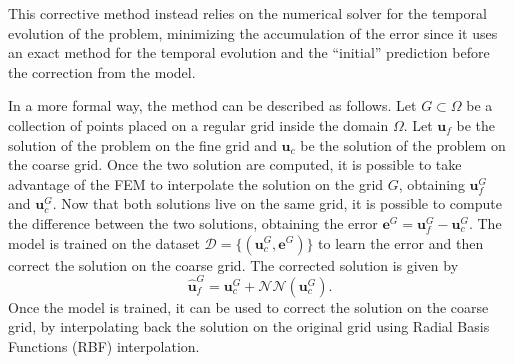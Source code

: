 This corrective method instead relies on the numerical solver for the temporal evolution of the problem, minimizing the accumulation of the error since it uses an exact method for the temporal evolution and the ``initial'' prediction before the correction from the model.

In a more formal way, the method can be described as follows. Let \(G \subset \Omega\) be a collection of points placed on a regular grid inside the domain \(\Omega\). Let \(\bm{u}_f\) be the solution of the problem on the fine grid and \(\bm{u}_c\) be the solution of the problem on the coarse grid. Once the two solution are computed, it is possible to take advantage of the FEM to interpolate the solution on the grid \(G\), obtaining \(\bm{u}_f^G\) and \(\bm{u}_c^G\). Now that both solutions live on the same grid, it is possible to compute the difference between the two solutions, obtaining the error \(\bm{e}^G = \bm{u}_f^G - \bm{u}_c^G\). The model is trained on the dataset \(\mathcal{D} = \{(\bm{u}_c^G, \bm{e}^G)\}\) to learn the error and then correct the solution on the coarse grid. The corrected solution is given by 
\[
    \hat{\bm{u}}_f^G = \bm{u}_c^G + \mathcal{NN}(\bm{u}_c^G).
\]
Once the model is trained, it can be used to correct the solution on the coarse grid, by interpolating back the solution on the original grid using Radial Basis Functions (RBF) interpolation. 